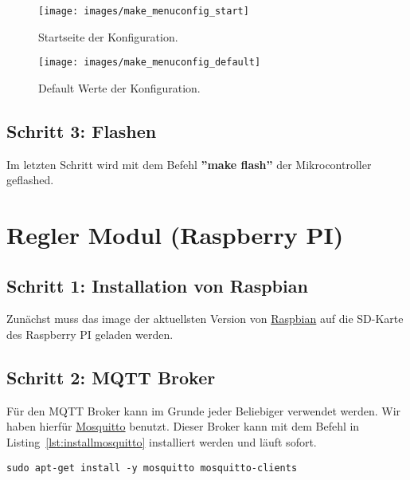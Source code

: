 \begin{figure}[hbt]
	\centering
	\texttt{[image: images/make\_menuconfig\_start]}
	\caption[Konfiguration Startseite]{Startseite der Konfiguration.}
	\label{fig:config_start}
\end{figure}

\begin{figure}[hbt]
	\centering
	\texttt{[image: images/make\_menuconfig\_default]}
	\caption[Konfiguration Standard]{Default Werte der Konfiguration.}
	\label{fig:config_default}
\end{figure}

\subsection{Schritt 3: Flashen}
Im letzten Schritt wird mit dem Befehl \textbf{''make flash''} der Mikrocontroller geflashed.

\section{Regler Modul (Raspberry PI)}

\subsection{Schritt 1: Installation von Raspbian}
Zunächst muss das image der aktuellsten Version von \href{https://www.raspberrypi.org/downloads/raspbian/}{Raspbian} auf die SD-Karte des Raspberry PI geladen werden.

\subsection{Schritt 2: MQTT Broker}
Für den MQTT Broker kann im Grunde jeder Beliebiger verwendet werden. Wir haben hierfür \href{http://mosquitto.org/}{Mosquitto} benutzt. Dieser Broker kann mit dem Befehl in Listing~\ref{lst:installmosquitto} installiert werden und läuft sofort.

\begin{lstlisting}
sudo apt-get install -y mosquitto mosquitto-clients
\end{lstlisting}

